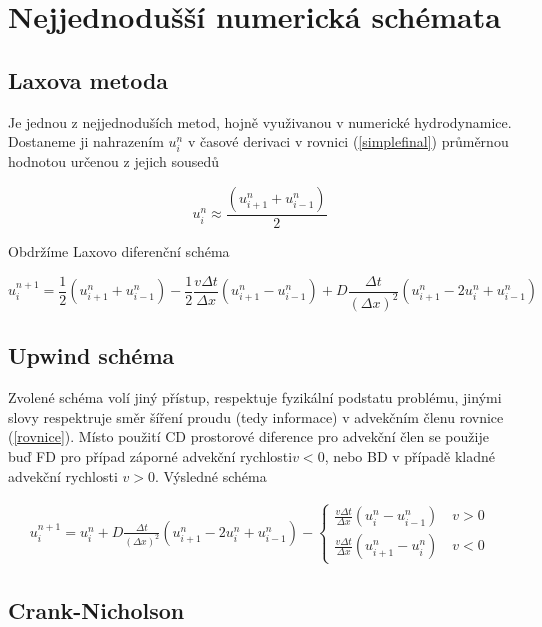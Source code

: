 \section{Nejjednodušší numerická schémata}

\subsection*{Laxova metoda}

Je jednou z nejjednoduších metod, hojně využivanou v numerické hydrodynamice. 
Dostaneme ji nahrazením $u_i^{n}$ v časové derivaci v rovnici (\ref{simplefinal}) 
průměrnou hodnotou určenou z jejich sousedů

$$
u_{i}^{n} \approx \frac{(u_{i+1}^{n} + u_{i-1}^n)}{2}
$$

Obdržíme Laxovo diferenční schéma

\begin{equation}
u_{i}^{n+1} 
=   \frac{1}{2}(u_{i+1}^{n}+u_{i-1}^{n})
-   \frac{1}{2}\frac{v\Delta t}{\Delta x}(u_{i+1}^n-u_{i-1}^n)
+ D \frac{\Delta t}{(\Delta x)^2}(u_{i+1}^n - 2 u_{i}^{n} + u_{i-1}^n)
\end{equation}

\subsection*{Upwind schéma }

Zvolené schéma volí jiný přístup, respektuje fyzikální podstatu problému, jinými 
slovy respektruje směr šíření proudu (tedy informace) v advekčním členu rovnice 
(\ref{rovnice}). Místo použití CD prostorové diference pro advekční člen se použije 
buď FD pro případ záporné advekční rychlosti$ v < 0$, nebo BD v případě kladné 
advekční rychlosti $v>0$. Výsledné schéma

\begin{eqnarray}
  u_{i}^{n+1}
= u_{i}^{n}
+ D\frac{\Delta t}{(\Delta x)^2}(u_{i+1}^n - 2 u_{i}^{n} + u_{i-1}^n)
-
\begin{cases}
    \frac{v\Delta t}{\Delta x}(u_{i}^n - u_{i-1}^n) \quad v > 0
    \\
    \frac{v\Delta t}{\Delta x}(u_{i+1}^n - u_{i}^n) \quad v < 0
\end{cases}
\label{upwind}
\end{eqnarray}

\subsection*{Crank-Nicholson}

